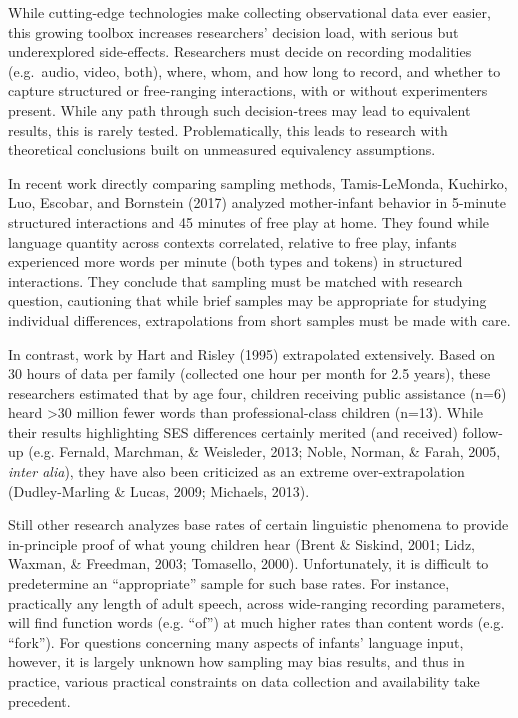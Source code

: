 \documentclass[man]{apa6}
\theoremstyle{definition}
\theoremstyle{definition}
\theoremstyle{definition}
\theoremstyle{remark}
\begin{document}
While cutting-edge technologies make collecting observational data ever
easier, this growing toolbox increases researchers' decision load, with
serious but underexplored side-effects. Researchers must decide on
recording modalities (e.g.~audio, video, both), where, whom, and how
long to record, and whether to capture structured or free-ranging
interactions, with or without experimenters present. While any path
through such decision-trees may lead to equivalent results, this is
rarely tested. Problematically, this leads to research with theoretical
conclusions built on unmeasured equivalency assumptions.

In recent work directly comparing sampling methods, Tamis-LeMonda,
Kuchirko, Luo, Escobar, and Bornstein (2017) analyzed mother-infant
behavior in 5-minute structured interactions and 45 minutes of free play
at home. They found while language quantity across contexts correlated,
relative to free play, infants experienced more words per minute (both
types and tokens) in structured interactions. They conclude that
sampling must be matched with research question, cautioning that while
brief samples may be appropriate for studying individual differences,
extrapolations from short samples must be made with care.

In contrast, work by Hart and Risley (1995) extrapolated extensively.
Based on 30 hours of data per family (collected one hour per month for
2.5 years), these researchers estimated that by age four, children
receiving public assistance (n=6) heard \textgreater{}30 million fewer
words than professional-class children (n=13). While their results
highlighting SES differences certainly merited (and received) follow-up
(e.g. Fernald, Marchman, \& Weisleder, 2013; Noble, Norman, \& Farah,
2005, \emph{inter alia}), they have also been criticized as an extreme
over-extrapolation (Dudley-Marling \& Lucas, 2009; Michaels, 2013).

Still other research analyzes base rates of certain linguistic phenomena
to provide in-principle proof of what young children hear (Brent \&
Siskind, 2001; Lidz, Waxman, \& Freedman, 2003; Tomasello, 2000).
Unfortunately, it is difficult to predetermine an \enquote{appropriate}
sample for such base rates. For instance, practically any length of
adult speech, across wide-ranging recording parameters, will find
function words (e.g. \enquote{of}) at much higher rates than content
words (e.g. \enquote{fork}). For questions concerning many aspects of
infants' language input, however, it is largely unknown how sampling may
bias results, and thus in practice, various practical constraints on
data collection and availability take precedent.
\end{document}
